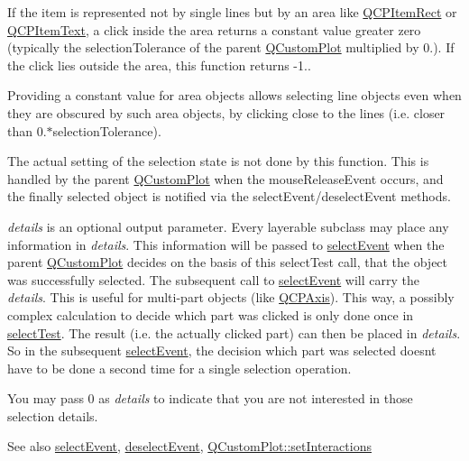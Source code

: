 If the item is represented not by single lines but by an area like \hyperlink{class_q_c_p_item_rect}{Q\+C\+P\+Item\+Rect} or \hyperlink{class_q_c_p_item_text}{Q\+C\+P\+Item\+Text}, a click inside the area returns a constant value greater zero (typically the selection\+Tolerance of the parent \hyperlink{class_q_custom_plot}{Q\+Custom\+Plot} multiplied by 0.). If the click lies outside the area, this function returns -\/1..

Providing a constant value for area objects allows selecting line objects even when they are obscured by such area objects, by clicking close to the lines (i.\+e. closer than 0.$\ast$selection\+Tolerance).

The actual setting of the selection state is not done by this function. This is handled by the parent \hyperlink{class_q_custom_plot}{Q\+Custom\+Plot} when the mouse\+Release\+Event occurs, and the finally selected object is notified via the select\+Event/deselect\+Event methods.

{\itshape details} is an optional output parameter. Every layerable subclass may place any information in {\itshape details}. This information will be passed to \hyperlink{class_q_c_p_axis_aa8a5fe80e2898ec08ada26b5fbee9eca}{select\+Event} when the parent \hyperlink{class_q_custom_plot}{Q\+Custom\+Plot} decides on the basis of this select\+Test call, that the object was successfully selected. The subsequent call to \hyperlink{class_q_c_p_axis_aa8a5fe80e2898ec08ada26b5fbee9eca}{select\+Event} will carry the {\itshape details}. This is useful for multi-\/part objects (like \hyperlink{class_q_c_p_axis}{Q\+C\+P\+Axis}). This way, a possibly complex calculation to decide which part was clicked is only done once in \hyperlink{class_q_c_p_axis_a2877a6230920c118be65c6113089f467}{select\+Test}. The result (i.\+e. the actually clicked part) can then be placed in {\itshape details}. So in the subsequent \hyperlink{class_q_c_p_axis_aa8a5fe80e2898ec08ada26b5fbee9eca}{select\+Event}, the decision which part was selected doesn\textquotesingle{}t have to be done a second time for a single selection operation.

You may pass 0 as {\itshape details} to indicate that you are not interested in those selection details.

\begin{DoxySeeAlso}{See also}
\hyperlink{class_q_c_p_axis_aa8a5fe80e2898ec08ada26b5fbee9eca}{select\+Event}, \hyperlink{class_q_c_p_axis_a53512242cde6ec21943a3ba10dbf78c3}{deselect\+Event}, \hyperlink{class_q_custom_plot_a5ee1e2f6ae27419deca53e75907c27e5}{Q\+Custom\+Plot\+::set\+Interactions} 
\end{DoxySeeAlso}


